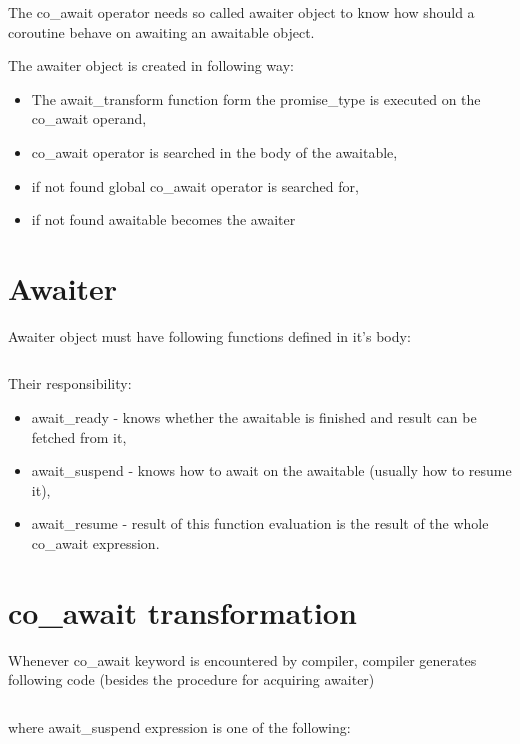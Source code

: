 \documentclass[twoside,twocolumn, 10pt]{article}
\begin{document}
	The co\_await operator needs so called awaiter object to know
	how should a coroutine behave on awaiting an awaitable object.

	The awaiter object is created in following way:

	\begin{itemize}
		\item The await\_transform function form the
		 promise\_type is executed on the co\_await operand,
		\item co\_await operator is searched in the body of the awaitable,
		\item if not found global co\_await operator is searched for,
		\item if not found awaitable becomes the awaiter
	\end{itemize}

  \pagebreak[0]
	\section{Awaiter}

	Awaiter object must have following functions defined in it's body:

	\inputminted{c++}{code-examples/theory-custom-coroutine/awaiter.hpp}

	Their responsibility:
	\begin{itemize}
		\item await\_ready - knows whether the awaitable is finished and result can be fetched from it,
		\item await\_suspend - knows how to await on the awaitable (usually how to resume it),
		\item await\_resume - result of this function evaluation is the result of the whole co\_await expression.
	\end{itemize}

  \pagebreak[0]
	\section{co\_await transformation}

	Whenever co\_await keyword is encountered by compiler, compiler generates following code (besides the procedure for acquiring awaiter)

	\inputminted{c++}{code-examples/theory-custom-coroutine/co-await-transformation.cpp}

	where await\_suspend expression is one of the following:
\end{document}
